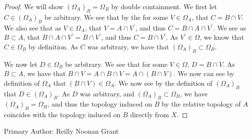 \begin{proof}
  We will show $(\Omega_A)_B=\Omega_B$ by double containment. We first
  let $C \in (\Omega_A)_B$ be arbitrary. We see that by the for some
  $V \in \Omega_A$, that $C = B \cap V$. We also see that as $V \in
  \Omega_A$, that $V = A \cap  V^\prime$, and thus $C = B \cap A \cap
  V^\prime$. We see as $B\subset A$, that 
  $B \cap A \cap V^\prime=B \cap V^\prime$, and thus $C =B \cap
  V^\prime$. As $V^\prime \in \Omega$, we know that $C \in \Omega_B$
  by definition. As $C$ was arbitrary, we have that 
  $(\Omega_A)_B \subset \Omega_B$.

  We now let $D \in \Omega_B$ be arbitrary. We see that for some $V
  \in \Omega$, $D = B \cap V$. As $B\subset A$, we have that $B \cap V
  = A\cap B \cap V=A\cap (B \cap V)$. We now can see by definition of
  $\Omega_A$ that $(B \cap V) \in \Omega_A$. We now see by the
  definition of $(\Omega_A)_B$ that $D\in (\Omega_A)_B$. As $D$ was
  arbitrary, and $(\Omega_A)_B \subset \Omega_B$, we have 
  $(\Omega_A)_B = \Omega_B$, and thus the topology induced on $B$ by
  the relative topology of $A$ coincides with the topology induced on
  $B$ directly from $X$.  
\end{proof}
Primary Author: Reilly Noonan Grant

